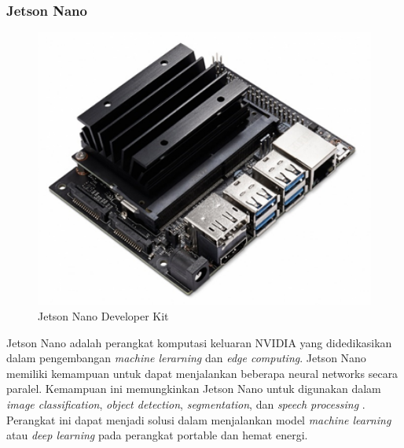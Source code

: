 \subsubsection{Jetson Nano}
 \begin{figure}[H]
     \centering

     \includegraphics[scale=0.4]{gambar/bab2-jetson-nano.png}
 
     \caption{Jetson Nano Developer Kit}
     \label{fig:jetsonnano}
\end{figure}

Jetson Nano adalah perangkat komputasi keluaran NVIDIA yang didedikasikan dalam pengembangan \textit{machine lerarning} dan \emph{edge computing}. Jetson Nano memiliki kemampuan untuk dapat menjalankan beberapa neural networks secara paralel. Kemampuan ini memungkinkan Jetson Nano untuk digunakan dalam \textit{image classification}, \textit{object detection}, \textit{segmentation}, dan \textit{speech processing} \parencite{nvidiaJetsonNano}. Perangkat ini dapat menjadi solusi dalam menjalankan model \textit{machine learning} atau \textit{deep learning} pada perangkat portable dan hemat energi. 

